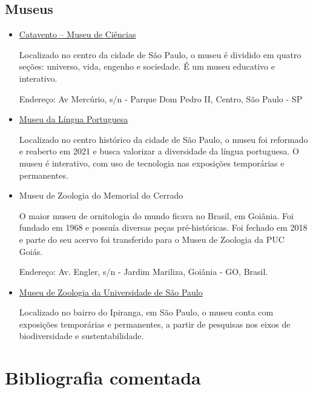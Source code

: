 \documentclass[11pt]{extarticle}
\begin{document}
\subsection{Museus}

\begin{itemize}

\item \href{https://museucatavento.org.br/}{Catavento – Museu de Ciências}

Localizado no centro da cidade de São Paulo, o museu é dividido em quatro seções: universo, vida, engenho e sociedade. É um museu educativo e interativo.

Endereço: Av Mercúrio, s/n - Parque Dom Pedro II, Centro, São Paulo - SP

\item \href{https://www.museudalinguaportuguesa.org.br/}{Museu da Língua Portuguesa}

Localizado no centro histórico da cidade de São Paulo, o museu foi reformado e reaberto em 2021 e busca valorizar a diversidade da língua portuguesa. O museu é interativo, com uso de tecnologia nas exposições temporárias e permanentes.

\item Museu de Zoologia do Memorial do Cerrado

O maior museu de ornitologia do mundo ficava no Brasil, em Goiânia. Foi fundado em 1968 e possuía diversas peças pré-históricas. Foi fechado em 2018 e parte do seu acervo foi transferido para o Museu de Zoologia da PUC Goiás.

Endereço: Av. Engler, s/n - Jardim Mariliza, Goiânia - GO, Brasil.

\item \href{https://mz.usp.br/}{Museu de Zoologia da Universidade de São Paulo}

Localizado no bairro do Ipiranga, em São Paulo, o museu conta com exposições temporárias e permanentes, a partir de pesquisas nos eixos de biodiversidade e sustentabilidade.

\end{itemize}

\section{Bibliografia comentada}
\end{document}
